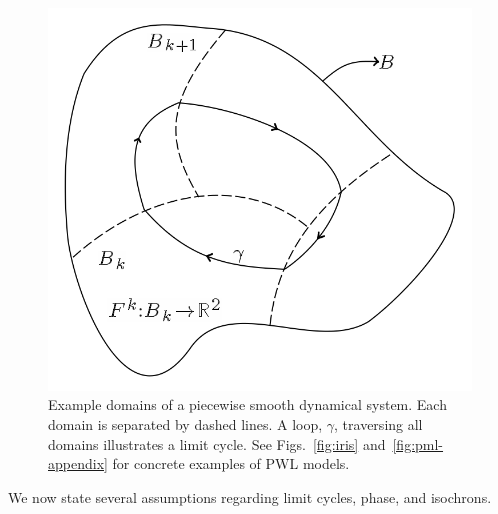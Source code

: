 \documentclass[12pt]{article}
\begin{document}
   \begin{figure}[h!]
   \begin{center}
    \includegraphics[width=.75\textwidth]{general_regions.png}
    \end{center}
    
    \caption[Example domains of a piecewise smooth dynamical system]{Example domains of a piecewise smooth dynamical system.  Each domain is separated by dashed lines.  A loop, $\gamma$, traversing all domains illustrates a limit cycle. See Figs.~\ref{fig:iris} and~\ref{fig:pml-appendix} for concrete examples of PWL models.}\label{fig:general_regions}
    \end{figure}

We now state several assumptions regarding limit cycles, phase, and isochrons.
\end{document}
